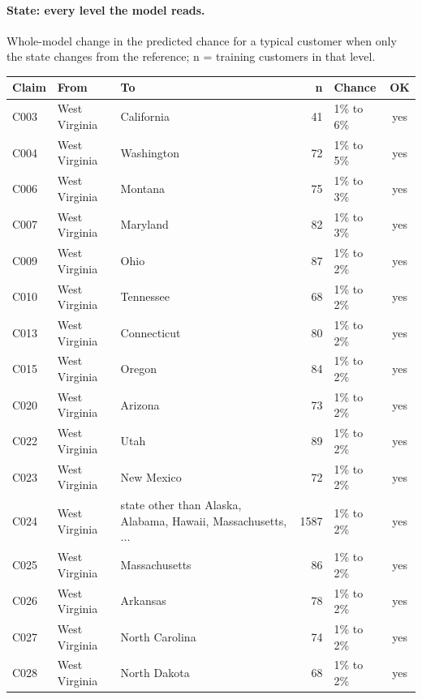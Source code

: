 \documentclass[a4paper,10pt]{article}
\newif\ifreviewmarks
\newcommand{\reviewrule}{\noindent{\color{BrickRed}\rule{\linewidth}{0.8pt}}}
\newenvironment{drafted}[1][]{%
  \ifreviewmarks\par\addvspace{\medskipamount}\reviewrule\par\nopagebreak
  \noindent{\color{BrickRed}\sffamily\footnotesize\textbf{Thesis Draft}\quad #1\hfill review}\par\nopagebreak\smallskip\fi}{%
  \ifreviewmarks\par\smallskip\noindent{\color{BrickRed}\sffamily\footnotesize end of thesis draft}\par\nopagebreak\reviewrule\par\medskip\fi}
\begin{document}
\begin{drafted}[plain-language layer: churn100-s2-c1]
\paragraph{State: every level the model reads.} Whole-model change in the predicted chance for a typical customer when only the state changes from the reference; n = training customers in that level.\par\smallskip
{\scriptsize{}
\begin{longtable}{@{}lllrlc@{}}
\toprule\rowcolor{white}
Claim & From & To & n & Chance & OK \\
\midrule\endhead
\bottomrule\endfoot
C003 & West Virginia & California & 41 & 1\% to 6\% & \textcolor{OliveGreen}{yes} \\
C004 & West Virginia & Washington & 72 & 1\% to 5\% & \textcolor{OliveGreen}{yes} \\
C006 & West Virginia & Montana & 75 & 1\% to 3\% & \textcolor{OliveGreen}{yes} \\
C007 & West Virginia & Maryland & 82 & 1\% to 3\% & \textcolor{OliveGreen}{yes} \\
C009 & West Virginia & Ohio & 87 & 1\% to 2\% & \textcolor{OliveGreen}{yes} \\
C010 & West Virginia & Tennessee & 68 & 1\% to 2\% & \textcolor{OliveGreen}{yes} \\
C013 & West Virginia & Connecticut & 80 & 1\% to 2\% & \textcolor{OliveGreen}{yes} \\
C015 & West Virginia & Oregon & 84 & 1\% to 2\% & \textcolor{OliveGreen}{yes} \\
C020 & West Virginia & Arizona & 73 & 1\% to 2\% & \textcolor{OliveGreen}{yes} \\
C022 & West Virginia & Utah & 89 & 1\% to 2\% & \textcolor{OliveGreen}{yes} \\
C023 & West Virginia & New Mexico & 72 & 1\% to 2\% & \textcolor{OliveGreen}{yes} \\
C024 & West Virginia & state other than Alaska, Alabama, Hawaii, Massachusetts, ... & 1587 & 1\% to 2\% & \textcolor{OliveGreen}{yes} \\
C025 & West Virginia & Massachusetts & 86 & 1\% to 2\% & \textcolor{OliveGreen}{yes} \\
C026 & West Virginia & Arkansas & 78 & 1\% to 2\% & \textcolor{OliveGreen}{yes} \\
C027 & West Virginia & North Carolina & 74 & 1\% to 2\% & \textcolor{OliveGreen}{yes} \\
C028 & West Virginia & North Dakota & 68 & 1\% to 2\% & \textcolor{OliveGreen}{yes} \\

\end{longtable}}
\end{drafted}
\end{document}
